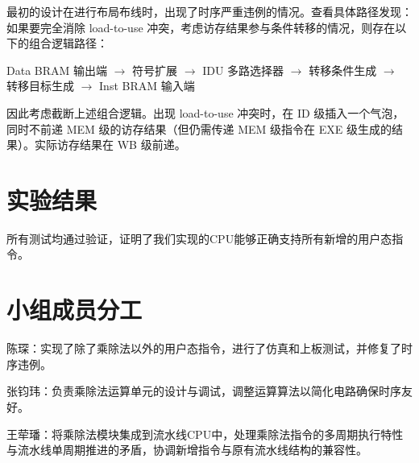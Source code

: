 \documentclass[11pt]{article}
\begin{document}
最初的设计在进行布局布线时，出现了时序严重违例的情况。查看具体路径发现：如果要完全消除 load-to-use 冲突，考虑访存结果参与条件转移的情况，则存在以下的组合逻辑路径：

Data BRAM 输出端 $\longrightarrow$ 符号扩展 $\longrightarrow$ IDU 多路选择器 $\longrightarrow$ 转移条件生成 $\longrightarrow$ 转移目标生成 $\longrightarrow$ Inst BRAM 输入端

因此考虑截断上述组合逻辑。出现 load-to-use 冲突时，在 ID 级插入一个气泡，同时不前递 MEM 级的访存结果（但仍需传递 MEM 级指令在 EXE 级生成的结果）。实际访存结果在 WB 级前递。

\section{实验结果}


所有测试均通过验证，证明了我们实现的CPU能够正确支持所有新增的用户态指令。


\section{小组成员分工}

陈琛：实现了除了乘除法以外的用户态指令，进行了仿真和上板测试，并修复了时序违例。

张钧玮：负责乘除法运算单元的设计与调试，调整运算算法以简化电路确保时序友好。

王荦璠：将乘除法模块集成到流水线CPU中，处理乘除法指令的多周期执行特性与流水线单周期推进的矛盾，协调新增指令与原有流水线结构的兼容性。
\end{document}
